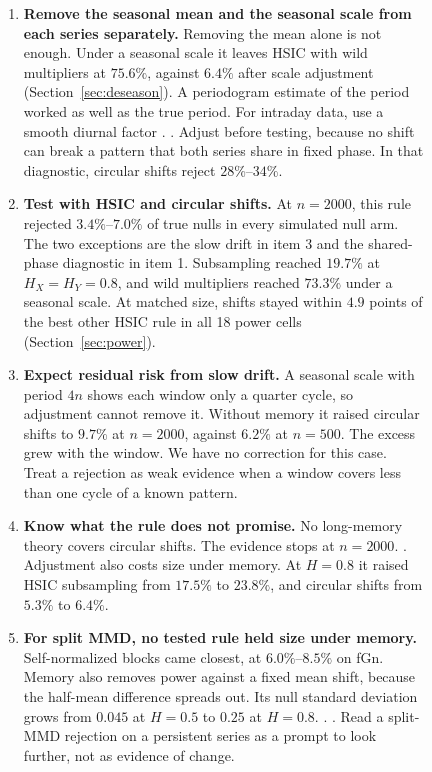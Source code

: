 \begin{figure}[H]
{\begin{minipage}{0.94\linewidth}
\begin{enumerate}[leftmargin=*,itemsep=2pt]
\item \textbf{Remove the seasonal mean and the seasonal scale from each series separately.} Removing the mean alone is not enough. Under a seasonal scale it leaves HSIC with wild multipliers at $75.6\%$, against $6.4\%$ after scale adjustment (Section~\ref{sec:deseason}). A periodogram estimate of the period worked as well as the true period. For intraday data, use a smooth diurnal factor \citep{engle1998acd,wu2012intraday}. . Adjust before testing, because no shift can break a pattern that both series share in fixed phase. In that diagnostic, circular shifts reject $28\%$--$34\%$.
\item \textbf{Test with HSIC and circular shifts.} At $n=2000$, this rule rejected $3.4\%$--$7.0\%$ of true nulls in every simulated null arm. The two exceptions are the slow drift in item 3 and the shared-phase diagnostic in item 1. Subsampling reached $19.7\%$ at $H_X=H_Y=0.8$, and wild multipliers reached $73.3\%$ under a seasonal scale. At matched size, shifts stayed within $4.9$ points of the best other HSIC rule in all 18 power cells (Section~\ref{sec:power}). 
\item \textbf{Expect residual risk from slow drift.} A seasonal scale with period $4n$ shows each window only a quarter cycle, so adjustment cannot remove it. Without memory it raised circular shifts to $9.7\%$ at $n=2000$, against $6.2\%$ at $n=500$. The excess grew with the window. We have no correction for this case. Treat a rejection as weak evidence when a window covers less than one cycle of a known pattern.
\item \textbf{Know what the rule does not promise.} No long-memory theory covers circular shifts. The evidence stops at $n=2000$. . Adjustment also costs size under memory. At $H=0.8$ it raised HSIC subsampling from $17.5\%$ to $23.8\%$, and circular shifts from $5.3\%$ to $6.4\%$.
\item \textbf{For split MMD, no tested rule held size under memory.} Self-normalized blocks came closest, at $6.0\%$--$8.5\%$ on fGn. Memory also removes power against a fixed mean shift, because the half-mean difference spreads out. Its null standard deviation grows from $0.045$ at $H=0.5$ to $0.25$ at $H=0.8$. . . Read a split-MMD rejection on a persistent series as a prompt to look further, not as evidence of change.
\end{enumerate}
\end{minipage}}
\end{figure}
